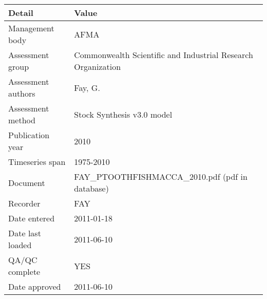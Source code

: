 \begin{table}[htb]
\centering
\begin{tabular}{lp{7cm}}
\toprule
Detail & Value \\
\midrule
Management body    & AFMA                                                         \\
Assessment group   & Commonwealth Scientific and Industrial Research Organization \\
Assessment authors & Fay, G.                                                      \\
Assessment method  & Stock Synthesis v3.0 model                                   \\
Publication year   & 2010                                                         \\
Timeseries span    & 1975-2010                                                    \\
Document           & FAY\_PTOOTHFISHMACCA\_2010.pdf (pdf in database)             \\
Recorder           & FAY                                                          \\
Date entered       & 2011-01-18                                                   \\
Date last loaded   & 2011-06-10                                                   \\
QA/QC complete     & YES                                                          \\
Date approved      & 2011-06-10                                                   \\
\bottomrule
\end{tabular}
\label{tab:assessdet}
\end{table}
